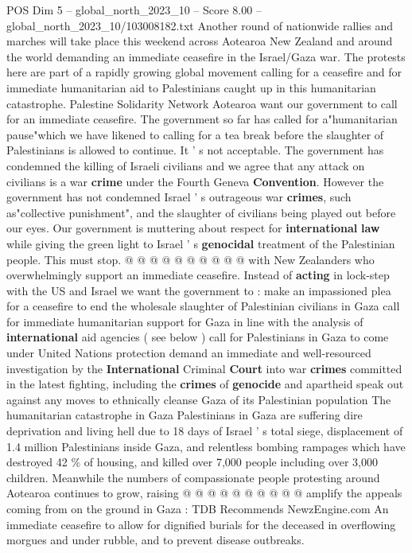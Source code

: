 \begin{textsample}{POS Dim 5 – global\_north\_2023\_10 – Score 8.00 – global\_north\_2023\_10/103008182.txt}  \label{ex:f5_pos_436}
Another round of nationwide rallies and marches will take place this weekend across Aotearoa New Zealand and around the world demanding an immediate ceasefire in the Israel/Gaza war.
The protests here are part of a rapidly growing global movement calling for a ceasefire and for immediate humanitarian aid to Palestinians caught up in this humanitarian catastrophe.
Palestine Solidarity Network Aotearoa want our government to call for an immediate ceasefire.
The government so far has called for a"humanitarian pause"which we have likened to calling for a tea break before the slaughter of Palestinians is allowed to continue.
It ' s not acceptable.
The government has condemned the killing of Israeli civilians and we agree that any attack on civilians is a war \textbf{crime} under the Fourth Geneva \textbf{Convention}.
However the government has not condemned Israel ' s outrageous war \textbf{crimes}, such as"collective punishment", and the slaughter of civilians being played out before our eyes.
Our government is muttering about respect for \textbf{international} \textbf{law} while giving the green light to Israel ' s \textbf{genocidal} treatment of the Palestinian people.
This must stop. @ @ @ @ @ @ @ @ @ @ with New Zealanders who overwhelmingly support an immediate ceasefire.
Instead of \textbf{acting} in lock-step with the US and Israel we want the government to : make an impassioned plea for a ceasefire to end the wholesale slaughter of Palestinian civilians in Gaza call for immediate humanitarian support for Gaza in line with the analysis of \textbf{international} aid agencies ( see below ) call for Palestinians in Gaza to come under United Nations protection demand an immediate and well-resourced investigation by the \textbf{International} Criminal \textbf{Court} into war \textbf{crimes} committed in the latest fighting, including the \textbf{crimes} of \textbf{genocide} and apartheid speak out against any moves to ethnically cleanse Gaza of its Palestinian population The humanitarian catastrophe in Gaza Palestinians in Gaza are suffering dire deprivation and living hell due to 18 days of Israel ' s total siege, displacement of 1.4 million Palestinians inside Gaza, and relentless bombing rampages which have destroyed 42 \% of housing, and killed over 7,000 people including over 3,000 children.
Meanwhile the numbers of compassionate people protesting around Aotearoa continues to grow, raising @ @ @ @ @ @ @ @ @ @ amplify the appeals coming from on the ground in Gaza : TDB Recommends NewzEngine.com An immediate ceasefire to allow for dignified burials for the deceased in overflowing morgues and under rubble, and to prevent disease outbreaks.

\end{textsample}
